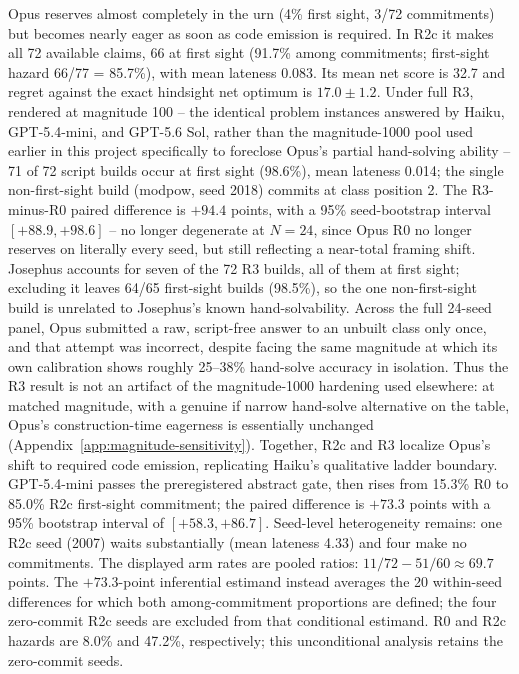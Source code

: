 \documentclass{article}
\begin{document}
Opus reserves almost completely in the urn (4\% first sight, 3/72 commitments)
but becomes nearly eager as soon as code
emission is required. In R2c it makes all 72 available claims, 66 at first sight
(91.7\% among commitments; first-sight hazard 66/77 = 85.7\%), with mean
lateness 0.083. Its mean net score is 32.7 and regret against the exact hindsight
net optimum is $17.0\pm1.2$. Under full R3, rendered at magnitude 100 -- the
identical problem instances answered by Haiku, GPT-5.4-mini, and GPT-5.6 Sol,
rather than the magnitude-1000 pool used earlier in this project specifically to
foreclose Opus's partial hand-solving ability -- 71 of 72 script builds occur at
first sight (98.6\%), mean lateness 0.014; the single non-first-sight build
(modpow, seed 2018) commits at class position 2. The R3-minus-R0 paired
difference is $+94.4$ points, with a 95\% seed-bootstrap interval
$[+88.9,+98.6]$ -- no longer degenerate at $N=24$, since Opus R0 no longer
reserves on literally every seed, but still reflecting a near-total framing
shift. Josephus accounts for seven of the 72 R3 builds, all of them at first
sight; excluding it leaves 64/65 first-sight builds (98.5\%), so the one
non-first-sight build is unrelated to Josephus's known hand-solvability. Across
the full 24-seed panel, Opus submitted a raw, script-free answer to an unbuilt
class only once, and that attempt was incorrect, despite facing the same
magnitude at which its own calibration shows roughly 25--38\% hand-solve
accuracy in isolation. Thus the R3 result is not an artifact of the
magnitude-1000 hardening used elsewhere: at matched magnitude, with a genuine
if narrow hand-solve alternative on the table, Opus's construction-time
eagerness is essentially unchanged (Appendix~\ref{app:magnitude-sensitivity}).
Together, R2c and R3 localize Opus's shift to required code emission,
replicating Haiku's qualitative ladder boundary. GPT-5.4-mini passes
the preregistered abstract gate, then rises from
15.3\% R0 to 85.0\% R2c first-sight commitment; the paired difference is
$+73.3$ points with a 95\% bootstrap interval of $[+58.3,+86.7]$. Seed-level
heterogeneity remains: one R2c seed (2007) waits substantially (mean lateness
4.33) and four make no commitments. The displayed arm rates are pooled ratios:
$11/72-51/60\approx69.7$
points. The $+73.3$-point inferential estimand instead averages the 20
within-seed differences for which both among-commitment proportions are
defined; the four zero-commit R2c seeds are excluded from that conditional
estimand. R0 and R2c hazards are 8.0\% and 47.2\%, respectively; this
unconditional analysis retains the zero-commit seeds.
\end{document}
